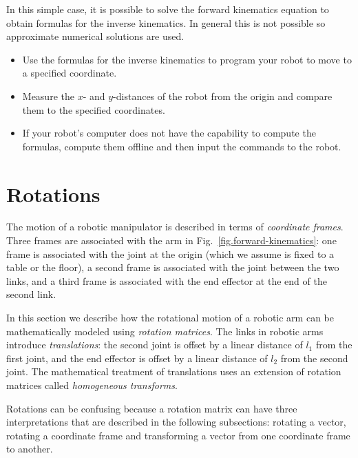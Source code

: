 In this simple case, it is possible to solve the forward kinematics equation to obtain formulas for the inverse kinematics. In general this is not possible so approximate numerical solutions are used.

\begin{framed}
\begin{itemize}
\item Use the formulas for the inverse kinematics to program your robot to move to a specified coordinate.
\item Measure the $x$- and $y$-distances of the robot from the origin and compare them to the specified coordinates.
\item If your robot's computer does not have the capability to compute the formulas, compute them offline and then input the commands to the robot.
\end{itemize}
\end{framed}


\section{Rotations}\label{s.rotations}

The motion of a robotic manipulator is described in terms of \emph{coordinate frames}. Three frames are associated with the arm in Fig.~\ref{fig.forward-kinematics}: one frame is associated with the joint at the origin (which we assume is fixed to a table or the floor), a second frame is associated with the joint between the two links,  and a third frame is associated with the end effector at the end of the second link.

In this section we describe how the rotational motion of a robotic arm can be mathematically modeled using \emph{rotation matrices}. The links in robotic arms introduce \emph{translations}: the second joint is offset by a linear distance of $l_1$ from the first joint, and the end effector is offset by a linear distance of $l_2$ from the second joint. The mathematical treatment of translations uses an extension of rotation matrices called \emph{homogeneous transforms}.

Rotations can be confusing because a rotation matrix can have three interpretations that are described in the following subsections: rotating a vector, rotating a coordinate frame and transforming a vector from one coordinate frame to another.

